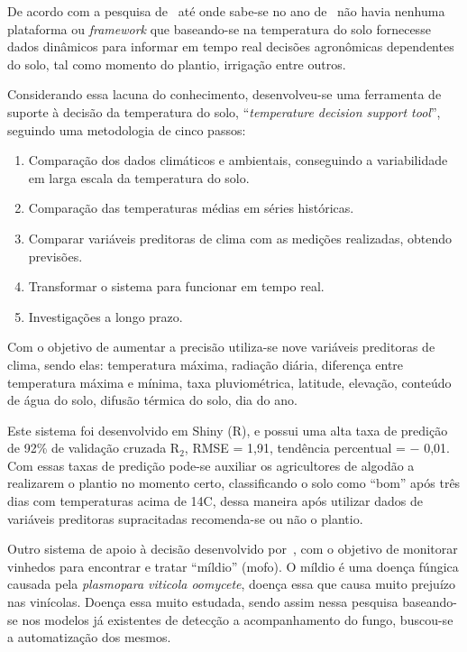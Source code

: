 \documentclass[
article,			%
12pt,				%
oneside,			%
a4paper,			%
english,			%
brazil,				%
sumario=tradicional
]{abntex2}
\begin{document}
De acordo com a pesquisa de~\citeauthor{1} até onde sabe-se no ano de~\citeyear{1} não havia nenhuma plataforma ou \textit{framework} que baseando-se na temperatura do solo fornecesse dados dinâmicos para informar em tempo real decisões agronômicas dependentes do solo, tal como momento do plantio, irrigação entre outros.

Considerando essa lacuna do conhecimento, desenvolveu-se uma ferramenta de suporte à decisão da temperatura do solo, ``\textit{temperature decision support tool}'', seguindo uma metodologia de cinco passos:
\begin{enumerate}
  \item Comparação dos dados climáticos e ambientais, conseguindo a variabilidade em larga escala da temperatura do solo.

  \item Comparação das temperaturas médias em séries históricas.
  \item Comparar variáveis preditoras de clima com as medições realizadas, obtendo previsões.
  \item Transformar o sistema para funcionar em tempo real.
  \item Investigações a longo prazo.
\end{enumerate}

Com o objetivo de aumentar a precisão utiliza-se nove variáveis preditoras de clima, sendo elas: temperatura máxima, radiação diária, diferença entre temperatura máxima e mínima, taxa pluviométrica, latitude, elevação, conteúdo de água do solo, difusão térmica do solo, dia do ano.

Este sistema foi desenvolvido em Shiny (R), e possui uma alta taxa de predição de 92\% de validação cruzada R$_{2}$, RMSE = 1,91, tendência percentual = $-$ 0,01.
Com essas taxas de predição pode-se auxiliar os agricultores de algodão a realizarem o plantio no momento certo, classificando o solo como ``bom'' após três dias com temperaturas acima de 14\textdegree C, dessa maneira após utilizar dados de variáveis preditoras supracitadas recomenda-se ou não o plantio.

Outro sistema de apoio à decisão desenvolvido por~\citeauthor{2}, com o objetivo de monitorar vinhedos para encontrar e tratar ``míldio'' (mofo).
O míldio é uma doença fúngica causada pela \textit{plasmopara viticola oomycete}, doença essa que causa muito prejuízo nas vinícolas\cite{2}. Doença essa muito estudada, sendo assim nessa pesquisa baseando-se nos modelos já existentes de detecção a acompanhamento do fungo, buscou-se a automatização dos mesmos.
\end{document}
